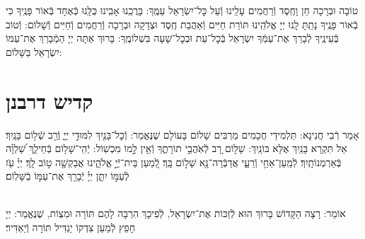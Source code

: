 \documentclass[twoside, openany, parskip=half, 11pt]{book}
\begin{document}
טוֹבָה וּבְרָכָה חֵן וָחֶֽסֶד וְֿרַחֲמִים עָלֵֽינוּ וְֿעַל כׇּל־יִשְׂרָאֵל עַמֶּֽךָ: בָּרֲכֵֽנוּ אָבִֽינוּ כֻּלָּֽנוּ כְּֿאֶחָד בְּֿאוֹר פָּנֶֽיךָ כִּי בְֿאוֹר פָּנֶֽיךָ נָתַֽתָּ לָֽנוּ יְיָ אֱלֹהֵֽינוּ תּוֹרַת חַיִּים וְֿאַהֲבַת חֶֽסֶד וּצְדָקָה וּבְרָכָה וְֿרַחֲמִים וְֿחַיִּים וְֿשָׁלוֹם: וְֿטוֹב בְּֿעֵינֶֽיךָ לְֿבָרֵךְ אֶת־עַמְּֿךָ יִשְׂרָאֵל בְּֿכׇל־עֵת וּבְכׇל־שָׁעָה בִּשְׁלוֹמֶֽךָ: בָּרוּךְ אַתָּה יְיָ הַמְֿבָרֵךְ אֶת־עַמּוֹ יִשְׂרָאֵל בַּשָּׁלוֹם:

\tachanunim

\vfill


\sepline


\chapter[קדיש דרבנן]{ קדיש דרבנן }
\label{kaddish derabonan}


אָמַר רְֿבִי חֲנִינָא: תַּלְמִידֵי חֲכָמִים מַרְבִּים שָׁלוֹם בָּעוֹלָם שֶׁנֶּאֱמַר: וְֿכׇל־בָּנַ֖יִךְ לִמּוּדֵ֣י יְיָ֑ וְֿרַ֖ב שְֿׁל֥וֹם בָּנָֽיִךְ׃ אַל תִּקְרָא בָּנַֽיִךְ אֶלָּא בּוֹנַֽיִךְ: שָׁל֣וֹם רָ֭ב לְֿאֹֽהֲבֵ֣י תוֹרָתֶ֑ךָ וְֿאֵ֖ין לָ֣מוֹ מִכְשֽׁוֹל: יְֿהִֽי־שָׁל֥וֹם בְּֿחֵילֵ֑ךְ שַׁ֝לְוָ֗ה בְּֿאַרְמְנוֹתָֽיִךְ׃ לְֿמַֽעַן־אַחַ֥י וְֿרֵעָ֑י אֲדַבְּֿרָה־נָּ֖א שָׁל֣וֹם בָּֽךְ׃ לְֿ֭מַעַן בֵּית־יְֿיָ֣ אֱלֹהֵ֑ינוּ אֲבַקְשָׁ֖ה ט֣וֹב לָֽךְ׃ יְיָ֗ עֹ֖ז לְֿעַמּ֣וֹ יִתֵּ֑ן יְיָ֓ יְֿבָרֵ֖ךְ אֶת־עַמּ֣וֹ בַֿשָּׁלֽוֹם׃

\\
אוֹמֵר: רָצָה הַקָּדוֹשׁ בָּרוּךְ הוּא לְֿזַכּוֹת אֶת־יִשְׂרָאֵל, לְֿפִיכָךְ הִרְבָּה לָהֶם תּוֹרָה וּמִצְוֹת, שֶׁנֶּאֱמַר:
יְיָ חָפֵץ לְֿמַעַן צִדְקוֹ יַגְדִּיל תּוֹרָה וְֿיַאְדִּיר׃
\end{document}
